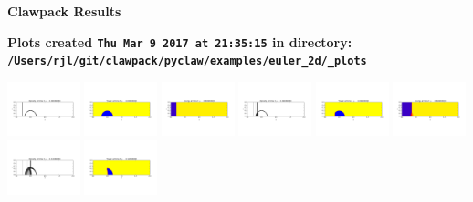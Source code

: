 \documentclass[11pt]{article}
\begin{document}
        \begin{center}{\Large\bf Clawpack Results}\vskip 5pt
        
        \bf Plots created {\tt Thu Mar  9 2017 at 21:35:15} in directory: \vskip 5pt
        \verb+/Users/rjl/git/clawpack/pyclaw/examples/euler_2d/_plots+
        \end{center}
        \vskip 5pt
        \includegraphics[width=0.158333333333\textwidth]{frame0000fig0.png}
\includegraphics[width=0.158333333333\textwidth]{frame0000fig1.png}
\includegraphics[width=0.158333333333\textwidth]{frame0000fig2.png}
\includegraphics[width=0.158333333333\textwidth]{frame0001fig0.png}
\includegraphics[width=0.158333333333\textwidth]{frame0001fig1.png}
\includegraphics[width=0.158333333333\textwidth]{frame0001fig2.png}
\vskip 10pt 
\includegraphics[width=0.158333333333\textwidth]{frame0002fig0.png}
\includegraphics[width=0.158333333333\textwidth]{frame0002fig1.png}
\end{document}
